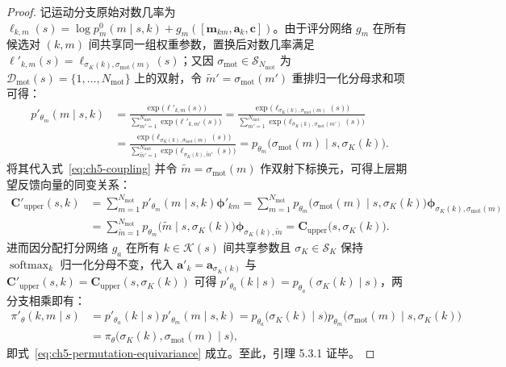 \begin{proof}
记运动分支原始对数几率为 $\ell_{k,m}(s)=\allowbreak\log p_m^0(m\mid s,k)+\allowbreak g_m([\mathbf{m}_{km},\allowbreak\mathbf{a}_k,\allowbreak\mathbf{c}])$。由于评分网络 $g_m$ 在所有候选对 $(k,m)$ 间共享同一组权重参数，置换后对数几率满足 $\ell'_{k,m}(s)=\allowbreak\ell_{\sigma_K(k),\sigma_{\mathrm{mot}}(m)}(s)$；又因 $\sigma_{\mathrm{mot}}\in\mathcal{S}_{N_{\mathrm{mot}}}$ 为 $\mathcal{D}_{\mathrm{mot}}(s)=\{1,\ldots,N_{\mathrm{mot}}\}$ 上的双射，令 $\tilde{m}'=\sigma_{\mathrm{mot}}(m')$ 重排归一化分母求和项可得：
\begin{align*}
    p'_{\theta_m}(m\mid s,k)
    &=\frac{\exp\big(\ell'_{k,m}(s)\big)}{\sum_{m'=1}^{N_{\mathrm{mot}}}\exp\big(\ell'_{k,m'}(s)\big)}
      =\frac{\exp\big(\ell_{\sigma_K(k),\sigma_{\mathrm{mot}}(m)}(s)\big)}{\sum_{m'=1}^{N_{\mathrm{mot}}}\exp\big(\ell_{\sigma_K(k),\sigma_{\mathrm{mot}}(m')}(s)\big)} \\
    &=\frac{\exp\big(\ell_{\sigma_K(k),\sigma_{\mathrm{mot}}(m)}(s)\big)}{\sum_{\tilde{m}'=1}^{N_{\mathrm{mot}}}\exp\big(\ell_{\sigma_K(k),\tilde{m}'}(s)\big)}
      =p_{\theta_m}\big(\sigma_{\mathrm{mot}}(m)\mid s,\sigma_K(k)\big).
\end{align*}
将其代入式~\eqref{eq:ch5-coupling} 并令 $\tilde{m}=\sigma_{\mathrm{mot}}(m)$ 作双射下标换元，可得上层期望反馈向量的同变关系：
\begin{align*}
    \mathbf{C}'_{\mathrm{upper}}(s,k)
    &=\sum_{m=1}^{N_{\mathrm{mot}}}p'_{\theta_m}(m\mid s,k)\boldsymbol{\phi}'_{km}
      =\sum_{m=1}^{N_{\mathrm{mot}}}p_{\theta_m}\big(\sigma_{\mathrm{mot}}(m)\mid s,\sigma_K(k)\big)\boldsymbol{\phi}_{\sigma_K(k),\sigma_{\mathrm{mot}}(m)} \\
    &=\sum_{\tilde{m}=1}^{N_{\mathrm{mot}}}p_{\theta_m}\big(\tilde{m}\mid s,\sigma_K(k)\big)\boldsymbol{\phi}_{\sigma_K(k),\tilde{m}}
      =\mathbf{C}_{\mathrm{upper}}\big(s,\sigma_K(k)\big).
\end{align*}
进而因分配打分网络 $g_a$ 在所有 $k\in\mathcal{K}(s)$ 间共享参数且 $\sigma_K\in\mathcal{S}_K$ 保持 $\operatorname{softmax}_k$ 归一化分母不变，代入 $\mathbf{a}'_k=\mathbf{a}_{\sigma_K(k)}$ 与 $\mathbf{C}'_{\mathrm{upper}}(s,k)=\mathbf{C}_{\mathrm{upper}}(s,\sigma_K(k))$ 可得 $p'_{\theta_a}(k\mid s)=p_{\theta_a}(\sigma_K(k)\mid s)$，两分支相乘即有：
\begin{align*}
    \pi'_\theta(k,m\mid s)
    &=p'_{\theta_a}(k\mid s)p'_{\theta_m}(m\mid s,k)
      =p_{\theta_a}\big(\sigma_K(k)\mid s\big)p_{\theta_m}\big(\sigma_{\mathrm{mot}}(m)\mid s,\sigma_K(k)\big) \\
    &=\pi_\theta\big(\sigma_K(k),\sigma_{\mathrm{mot}}(m)\mid s\big),
\end{align*}
即式~\eqref{eq:ch5-permutation-equivariance} 成立。至此，引理 5.3.1 证毕。
\end{proof}

